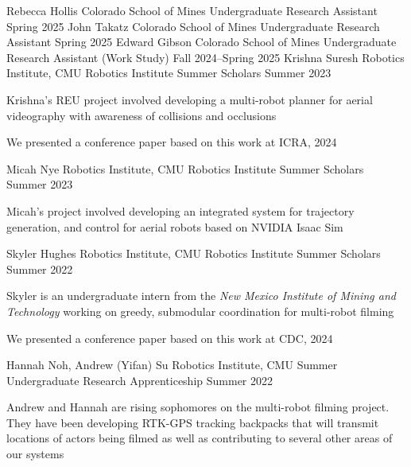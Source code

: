 \pagebreak[4]
\begin{cventries}
  \cventry
  {Rebecca Hollis}
  {Colorado School of Mines}
  {Undergraduate Research Assistant}
  {Spring 2025}
  {
  }
  \cventry
  {John Takatz}
  {Colorado School of Mines}
  {Undergraduate Research Assistant}
  {Spring 2025}
  {
  }
  \cventry
  {Edward Gibson}
  {Colorado School of Mines}
  {Undergraduate Research Assistant (Work Study)}
  {Fall 2024--Spring 2025}
  {
  }
  \cventry
  {Krishna Suresh}
  {Robotics Institute, CMU}
  {Robotics Institute Summer Scholars}
  {Summer 2023}
  {
    \begin{cvitems}
      \item Krishna's REU project involved developing a multi-robot planner
        for aerial videography with awareness of collisions and occlusions
      \item We presented a conference paper based on this work at ICRA, 2024
    \end{cvitems}
  }
  \cventry
  {Micah Nye}
  {Robotics Institute, CMU}
  {Robotics Institute Summer Scholars}
  {Summer 2023}
  {
    \begin{cvitems}
      \item Micah's project involved developing an integrated system for
        trajectory generation, and control for aerial robots based on NVIDIA
        Isaac Sim
    \end{cvitems}
  }
  \cventry
  {Skyler Hughes}
  {Robotics Institute, CMU}
  {Robotics Institute Summer Scholars}
  {Summer 2022}
  {
    \begin{cvitems}
      \item Skyler is an undergraduate intern from the
        \emph{New Mexico Institute of Mining and Technology}
        working on greedy, submodular coordination for multi-robot filming
      \item We presented a conference paper based on this work at CDC, 2024
    \end{cvitems}
  }
  \cventry
  {Hannah Noh, Andrew (Yifan) Su}
  {Robotics Institute, CMU}
  {Summer Undergraduate Research Apprenticeship}
  {Summer 2022}
  {
    \begin{cvitems}
    \item Andrew and Hannah are rising sophomores on the multi-robot filming
      project.
      They have been developing RTK-GPS tracking backpacks that will transmit
      locations of actors being filmed as well as contributing to several other
      areas of our systems
    \end{cvitems}
  }
\end{cventries}
